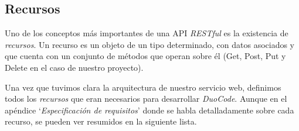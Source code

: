 \subsection{Recursos}

Uno de los conceptos más importantes de una API \textit{RESTful} es la existencia de \textit{recursos}. Un recurso es un objeto de un tipo determinado, con datos asociados y que cuenta con un conjunto de métodos que operan sobre él (Get, Post, Put y Delete en el caso de nuestro proyecto).

\vspace{1em}

Una vez que tuvimos clara la arquitectura de nuestro servicio web, definimos todos los \textit{recursos} que eran necesarios para desarrollar \textit{DuoCode}. Aunque en el apéndice `\textit{Especificación de requisitos}' donde se habla detalladamente sobre cada recurso,  se pueden ver resumidos en la siguiente lista.

